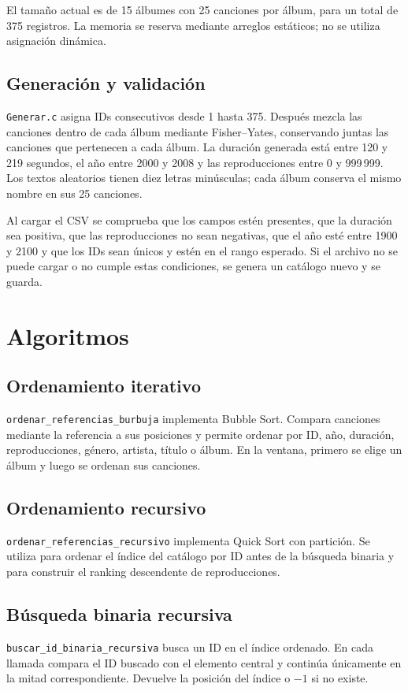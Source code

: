 \documentclass[11pt,a4paper]{article}
\begin{document}
El tamaño actual es de 15 álbumes con 25 canciones por álbum, para un total de 375 registros. La memoria se reserva mediante arreglos estáticos; no se utiliza asignación dinámica.

\subsection{Generación y validación}
\texttt{Generar.c} asigna IDs consecutivos desde 1 hasta 375. Después mezcla las canciones dentro de cada álbum mediante Fisher--Yates, conservando juntas las canciones que pertenecen a cada álbum. La duración generada está entre 120 y 219 segundos, el año entre 2000 y 2008 y las reproducciones entre 0 y 999\,999. Los textos aleatorios tienen diez letras minúsculas; cada álbum conserva el mismo nombre en sus 25 canciones.

Al cargar el CSV se comprueba que los campos estén presentes, que la duración sea positiva, que las reproducciones no sean negativas, que el año esté entre 1900 y 2100 y que los IDs sean únicos y estén en el rango esperado. Si el archivo no se puede cargar o no cumple estas condiciones, se genera un catálogo nuevo y se guarda.

\section{Algoritmos}
\subsection{Ordenamiento iterativo}
\texttt{ordenar\_referencias\_burbuja} implementa Bubble Sort. Compara canciones mediante la referencia a sus posiciones y permite ordenar por ID, año, duración, reproducciones, género, artista, título o álbum. En la ventana, primero se elige un álbum y luego se ordenan sus canciones.

\subsection{Ordenamiento recursivo}
\texttt{ordenar\_referencias\_recursivo} implementa Quick Sort con partición. Se utiliza para ordenar el índice del catálogo por ID antes de la búsqueda binaria y para construir el ranking descendente de reproducciones.
\subsection{Búsqueda binaria recursiva}
\texttt{buscar\_id\_binaria\_recursiva} busca un ID en el índice ordenado. En cada llamada compara el ID buscado con el elemento central y continúa únicamente en la mitad correspondiente. Devuelve la posición del índice o $-1$ si no existe.
\end{document}
